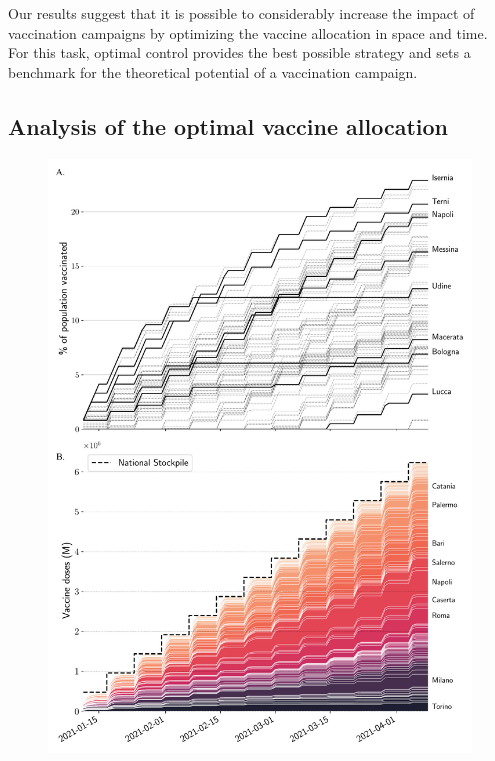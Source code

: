 Our results suggest that it is possible to considerably increase the impact of vaccination campaigns by optimizing the vaccine allocation in space and time. For this task, optimal control provides the best possible strategy and sets a benchmark for the theoretical potential of a vaccination campaign.

\subsection*{Analysis of the optimal vaccine allocation}

\begin{figure}[!ht]
    \centering
    \includegraphics[width=\textwidth]{fig_italy-ocp/figures/ts_both.pdf}

\end{figure}
